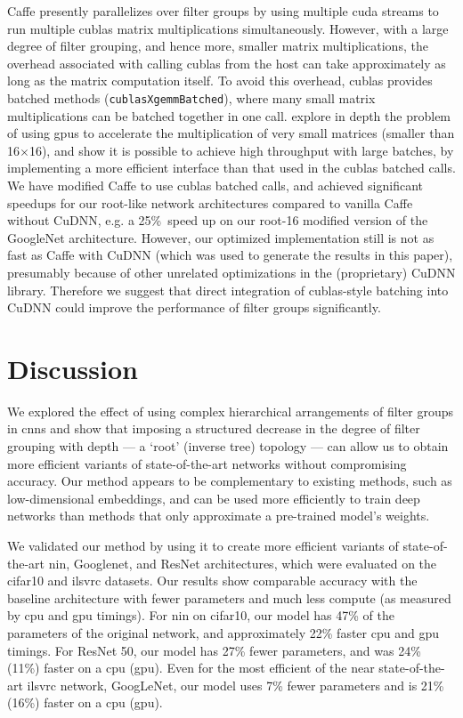 \documentclass[thesis]{subfiles}
\begin{document}
	Caffe presently parallelizes over filter groups by using multiple \gls{cuda} streams to run multiple \gls{cublas} matrix multiplications simultaneously. However, with a large degree of filter grouping, and hence more, smaller matrix multiplications, the overhead associated with calling \gls{cublas} from the host can take approximately as long as the matrix computation itself. To avoid this overhead, \gls{cublas} provides batched methods (\eg \texttt{cublasXgemmBatched}), where many small matrix multiplications can be batched together in one call. \citet{Jhurani2015} explore in depth the problem of using \gls{gpu}s to accelerate the multiplication of very small matrices (smaller than 16$\times$16), and show it is possible to achieve high throughput with large batches, by implementing a more efficient interface than that used in the \gls{cublas} batched calls.
	We have modified Caffe to use \gls{cublas} batched calls, and achieved significant speedups for our  root-like network architectures compared to vanilla Caffe without CuDNN, e.g. a 25\%\ speed up on our root-16 modified version of the GoogleNet architecture. However, our optimized implementation still is not as fast as Caffe with CuDNN (which was used to generate the results in this paper), presumably because of other unrelated optimizations in the (proprietary) CuDNN library. Therefore we suggest that direct integration of \gls{cublas}-style batching into CuDNN could improve the performance of filter groups significantly.
	
	\section{Discussion}
	We explored the effect of using complex hierarchical arrangements of filter groups in \glspl{cnn} and show that imposing a structured decrease in the degree of filter grouping with depth --- a `root' (inverse tree) topology --- can allow us to obtain more efficient variants of state-of-the-art networks without compromising accuracy. Our method appears to be complementary to existing methods, such as low-dimensional embeddings, and can be used more efficiently to train deep networks than methods that only approximate a pre-trained model's weights.
	
	We validated our method by using it to create more efficient variants of state-of-the-art \gls{nin}, Googlenet, and ResNet architectures, which were evaluated on the \gls{cifar10} and \gls{ilsvrc} datasets. Our results show comparable accuracy with the baseline architecture with fewer parameters and much less compute (as measured by \gls{cpu} and \gls{gpu} timings). For \gls{nin} on \gls{cifar10}, our model has 47\% of the parameters of the original network, and approximately 22\% faster \gls{cpu} and \gls{gpu} timings. For ResNet 50, our model has 27\% fewer parameters, and was 24\% (11\%) faster on a \gls{cpu} (\gls{gpu}). 
	Even for the most efficient of the near state-of-the-art \gls{ilsvrc} network, GoogLeNet, our model uses 7\% fewer parameters and is 21\% (16\%) faster on a \gls{cpu} (\gls{gpu}).
	
	
\end{document}

